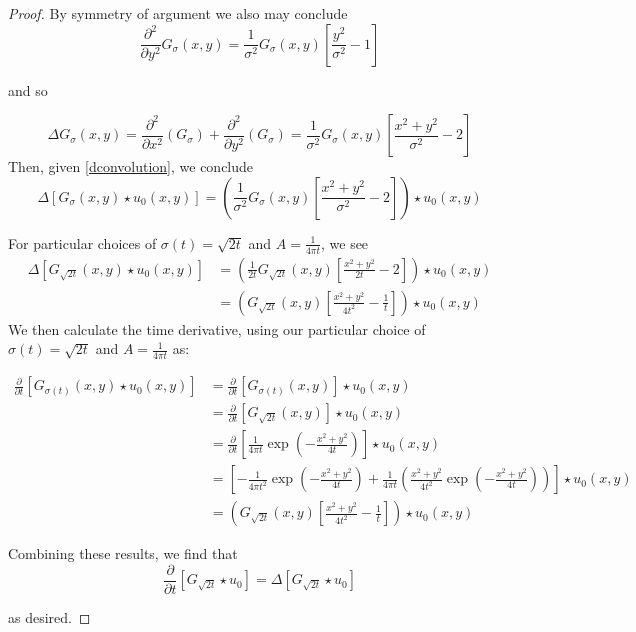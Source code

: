 \begin{proof}
    	By symmetry of argument we also may conclude
    	\[
    	\frac{\partial^2}{\partial y^2} G_{\sigma}(x,y) = \frac{1}{\sigma^2} G_\sigma(x,y)  \left[ \frac{y^2}{\sigma^2} - 1\right]
    	\]
    	
    	and so
    	
    	\begin{equation}
    	\Delta G_\sigma(x,y) =
    	\frac{\partial^2}{\partial x^2} \left(G_{\sigma}\right)
    	+ \frac{\partial^2}{\partial y^2} \left(G_{\sigma}\right)
    	= \frac{1}{\sigma^2} G_\sigma(x,y) \left[ \frac{x^2 + y^2}{\sigma^2} - 2\right] 
    	\end{equation}
    	Then, given \cref{dconvolution}, we conclude
    	\begin{equation}
    	\Delta \left[ G_\sigma(x,y) \star u_0(x,y) \right] 
    	= \left(\frac{1}{\sigma^2} G_\sigma(x,y) \left[ \frac{x^2 + y^2}{\sigma^2} - 2\right]\right) \star u_0(x,y)
    	\end{equation}
    	
    	For particular choices of $\sigma(t) = \sqrt{2t}$ and $A = \frac{1}{4\pi t}$,
    	we see 
    	\begin{align}
    	\Delta \left[ G_{\sqrt{2t}}(x,y) \star u_0(x,y) \right] 
    	&= \left(\frac{1}{2t} G_{\sqrt{2t}}(x,y) \left[ \frac{x^2 + y^2}{2t} - 2\right]\right) \star u_0(x,y) \\
    	&= \left(G_{\sqrt{2t}}(x,y) \left[ \frac{x^2 + y^2}{4t^2} - \frac{1}{t}\right]\right) \star u_0(x,y)
    	\end{align}
    	We then calculate the time derivative,
    	using our particular choice of $\sigma(t) = \sqrt{2t}$ and $A = \frac{1}{4\pi t}$ as:
    	
    	\begin{align}
    	\frac{\partial}{\partial t} \left[ G_{\sigma(t)}(x,y) \star u_0(x,y) \right]
    	&= \frac{\partial}{\partial t} \left[ G_{\sigma(t)}(x,y) \right] \star u_0(x,y) \\
    	&= \frac{\partial}{\partial t} \left[ G_{\sqrt{2t}}(x,y)\right] \star u_0(x,y) \\
    	&= \frac{\partial}{\partial t} \left[
    	\frac{1}{4\pi t} \exp\left(-\frac{x^2 + y^2}{4t}\right) \right] \star u_0(x,y) \\
    	&= \left[ -\frac{1}{4\pi t^2} \exp\left(-\frac{x^2 + y^2}{4t}\right) + 
    	\frac{1}{4\pi t}\left( \frac{x^2 + y^2}{4t^2} \exp\left(-\frac{x^2 + y^2}{4t}\right)\right)
    	\right] \star u_0(x,y) \\
    	&= \left(G_{\sqrt{2t}}(x,y) \left[ \frac{x^2 + y^2}{4t^2} -\frac{1}{t}\right]\right) \star u_0(x,y)
    	\end{align}
    	
    	Combining these results, we find that
    	\begin{equation}
    	\frac{\partial}{\partial t} \left[ G_{\sqrt{2t}} \star u_0 \right]
    	= \Delta \left[ G_{\sqrt{2t}} \star u_0 \right] 
    	\end{equation}
    	
    	as desired. \end{proof}
    
